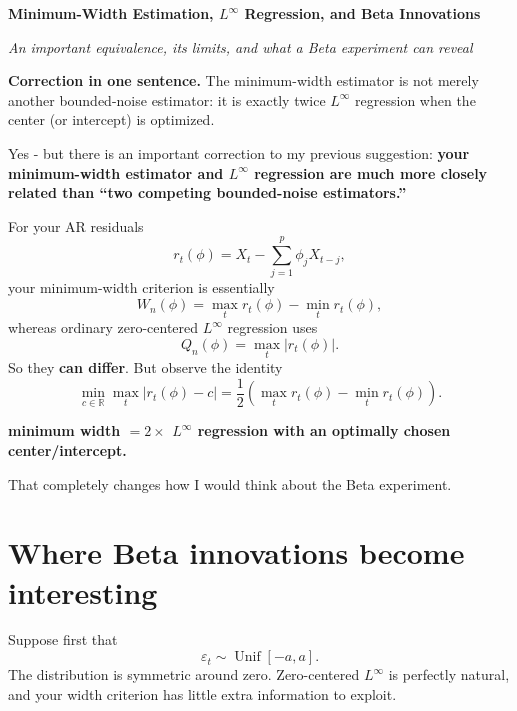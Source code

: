 \documentclass[10pt,a4paper]{article}
\begin{document}
\vspace*{8mm}
{\sffamily\bfseries\color{navy}\fontsize{24}{28}\selectfont
Minimum-Width Estimation, $L^\infty$ Regression, and Beta Innovations\par}
\vspace{4mm}
{\itshape\color{muted}\fontsize{11.5}{15}\selectfont
An important equivalence, its limits, and what a Beta experiment can reveal\par}
\vspace{5mm}

\begin{keybox}
\centering\sffamily
\textbf{Correction in one sentence.} The minimum-width estimator is not merely another bounded-noise estimator: it is exactly twice $L^\infty$ regression when the center (or intercept) is optimized.
\end{keybox}

\vspace{2mm}
Yes - but there is an important correction to my previous suggestion: \textbf{your minimum-width estimator and $L^\infty$ regression are much more closely related than ``two competing bounded-noise estimators.''}

For your AR residuals
\[
r_t(\phi)=X_t-\sum_{j=1}^{p}\phi_jX_{t-j},
\]
your minimum-width criterion is essentially
\[
W_n(\phi)=\max_t r_t(\phi)-\min_t r_t(\phi),
\]
whereas ordinary zero-centered $L^\infty$ regression uses
\[
Q_n(\phi)=\max_t\lvert r_t(\phi)\rvert.
\]
So they \textbf{can differ}. But observe the identity
\[
\min_{c\in\mathbb{R}}\max_t\lvert r_t(\phi)-c\rvert
=\frac12\left(\max_t r_t(\phi)-\min_t r_t(\phi)\right).
\]

\begin{keybox}
\centering\sffamily\bfseries\color{navy}
minimum width $=2\times$ $L^\infty$ regression with an optimally chosen center/intercept.
\end{keybox}

That completely changes how I would think about the Beta experiment.

\clearpage
\section*{Where Beta innovations become interesting}

Suppose first that
\[
\varepsilon_t\sim\operatorname{Unif}[-a,a].
\]
The distribution is symmetric around zero. Zero-centered $L^\infty$ is perfectly natural, and your width criterion has little extra information to exploit.
\end{document}
